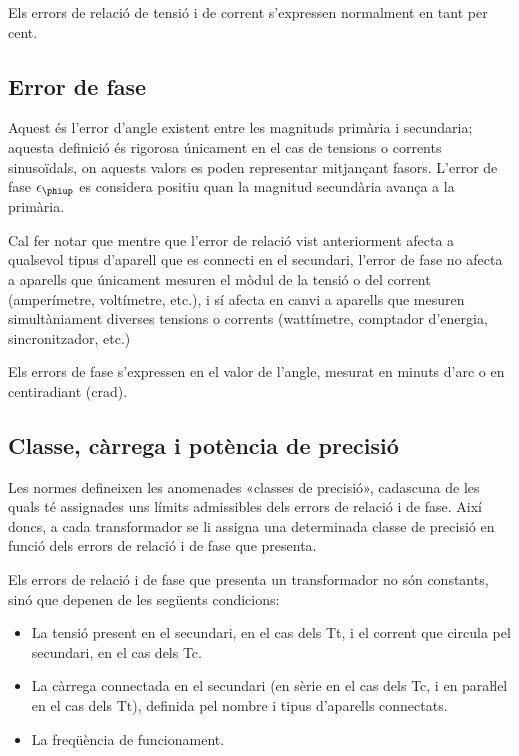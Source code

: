 Els errors de relació de tensió i de corrent s'expressen
normalment en tant per cent.

\subsection{Error de fase}

Aquest és l'error d'angle  existent entre les magnituds primària i
secundaria; aquesta definició és rigorosa únicament en el cas de
tensions o corrents sinusoïdals, on aquests valors es poden
representar mitjançant fasors. L'error de fase $\epsilon\ped{\phiup}$ es considera positiu quan la magnitud secundària avança a la primària.
\index{$\epsilon\ped{\phiup}$}

 Cal fer notar que mentre que l'error de relació
vist anteriorment afecta a qualsevol tipus d'aparell que es
connecti en el secundari, l'error de fase no afecta a aparells que
únicament mesuren el mòdul de la tensió o del corrent (amperímetre,
voltímetre, etc.), i sí afecta en canvi a aparells que mesuren
simultàniament diverses tensions o corrents (wattímetre, comptador
d'energia, sincronitzador, etc.)

Els errors de fase s'expressen en el valor de l'angle, mesurat en
minuts d'arc o en centiradiant (crad).

\subsection{Classe, càrrega i potència de precisió}

Les normes defineixen les anomenades «classes de precisió»,
cadascuna de les quals té assignades uns límits admissibles dels
errors de relació i de fase. Així doncs, a cada transformador
se li assigna una determinada classe de precisió en funció dels errors
de relació i de fase que presenta.

Els errors de relació i de fase que presenta un transformador no són
constants, sinó que depenen de les següents condicions:
\begin{itemize}
   \item La tensió present en el secundari, en el cas dels Tt, i el corrent que
   circula    pel secundari, en el cas dels Tc.
   \item La càrrega connectada en el secundari (en sèrie en el cas dels Tc,
   i en paraŀlel en el cas dels Tt), definida pel nombre i tipus d'aparells connectats.
   \item La freqüència de funcionament.
\end{itemize}

